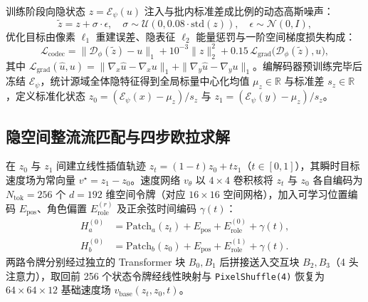 \documentclass[journal]{IEEEtran}
\begin{document}
训练阶段向隐状态 $z = \mathcal{E}_\psi(u)$ 注入与批内标准差成比例的动态高斯噪声：
\begin{equation}
\tilde{z} = z + \sigma \cdot \epsilon, \quad \sigma \sim \mathcal{U}(0, 0.08 \cdot \text{std}(z)), \quad \epsilon \sim \mathcal{N}(0, I),
\end{equation}
优化目标由像素 $\ell_1$ 重建误差、隐表征 $\ell_2$ 能量惩罚与一阶空间梯度损失构成：
\begin{equation}
\mathcal{L}_{\text{codec}} = \|\mathcal{D}_\phi(\tilde{z}) - u\|_1 + 10^{-3}\|z\|_2^2 + 0.15\,\mathcal{L}_{\text{grad}}\big(\mathcal{D}_\phi(\tilde{z}), u\big),
\end{equation}
其中 $\mathcal{L}_{\text{grad}}(\hat{u}, u) = \|\nabla_x \hat{u} - \nabla_x u\|_1 + \|\nabla_y \hat{u} - \nabla_y u\|_1$。编解码器预训练完毕后冻结 $\mathcal{E}_\psi$，统计源域全体隐特征得到全局标量中心化均值 $\mu_z \in \mathbb{R}$ 与标准差 $s_z \in \mathbb{R}$，定义标准化状态 $z_0 = (\mathcal{E}_\psi(x) - \mu_z)/s_z$ 与 $z_1 = (\mathcal{E}_\psi(y) - \mu_z)/s_z$。

\subsection{隐空间整流流匹配与四步欧拉求解}
在 $z_0$ 与 $z_1$ 间建立线性插值轨迹 $z_t = (1-t)z_0 + t z_1$（$t \in [0, 1]$），其瞬时目标速度场为常向量 $v^\star = z_1 - z_0$。速度网络 $v_\theta$ 以 $4\times 4$ 卷积核将 $z_t$ 与 $z_0$ 各自编码为 $N_{\text{tok}}=256$ 个 $d=192$ 维空间令牌（对应 $16\times 16$ 空间网格），加入可学习位置编码 $E_{\text{pos}}$、角色偏置 $E_{\text{role}}^{(r)}$ 及正余弦时间编码 $\gamma(t)$：
\begin{equation}
\begin{aligned}
H_a^{(0)} &= \text{Patch}_a(z_t) + E_{\text{pos}} + E_{\text{role}}^{(0)} + \gamma(t), \\
H_b^{(0)} &= \text{Patch}_b(z_0) + E_{\text{pos}} + E_{\text{role}}^{(1)} + \gamma(t).
\end{aligned}
\end{equation}
两路令牌分别经过独立的 Transformer 块 $B_0, B_1$ 后拼接送入交互块 $B_2, B_3$（4 头注意力），取回前 256 个状态令牌经线性映射与 \texttt{PixelShuffle(4)} 恢复为 $64\times 64\times 12$ 基础速度场 $v_{\text{base}}(z_t, z_0, t)$。
\end{document}
